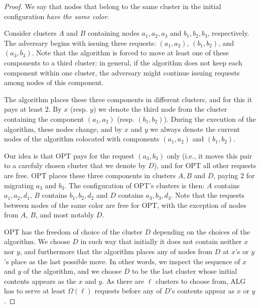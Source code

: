 \begin{proof}
We say that nodes that belong to the same cluster in the initial configuration \emph{have the same color}.

Consider clusters $A$ and $B$ containing nodes $a_1, a_2, a_3$ and $b_1, b_2, b_3$, respectively.
The adversary begins with issuing three requests: $(a_1, a_2)$, $(b_1, b_2)$, and $(a_3, b_3)$.
Note that the algorithm is forced to move at least one of these components to a third cluster:
in general, if the algorithm does not keep each component within one cluster, the adversary might continue issuing requests among nodes of this component.



The algorithm places these three components in different clusters, and for this it pays at least $2$.
By $x$ (resp. $y$) we denote the third node from the cluster containing the component $(a_1, a_2)$ (resp. $(b_1, b_2)$).
During the execution of the algorithm, these nodes change, and by $x$ and $y$ we always denote the current nodes of the algorithm colocated with components $(a_1, a_2)$ and $(b_1, b_2)$.


Our idea is that OPT pays for the request $(a_3, b_3)$ only (i.e., it moves this pair to a carefuly chosen cluster that we denote by $D$), and for OPT all other requests are free. 
OPT places these three components in clusters $A, B$ and $D$, paying $2$ for migrating $a_3$ and $b_3$.
The configuration of OPT's clusters is then: $A$ contains $a_1, a_2,d_1$, $B$ contains $b_1, b_2,d_2$ and $D$ contains $a_3, b_3, d_3$.
Note that the requests between nodes of the same color are free for OPT, with the exception of nodes from $A$, $B$, and most notably $D$.

OPT has the freedom of choice of the cluster $D$ depending on the choices of the algorithm.
We choose $D$ in such way that initially it does not contain neither $x$ nor $y$, and furthermore that the algorithm places any of nodes from $D$ at $x$'s or $y$'s place as the last possible move.
In other words, we inspect the sequence of $x$ and $y$ of the algorithm, and we choose $D$ to be the last cluster whose initial contents appears as the $x$ and $y$.
As there are $\ell$ clusters to choose from, ALG has to serve at least $\Omega(\ell)$ requests before any of $D$'s contents appear as $x$ or $y$.


\end{proof}
